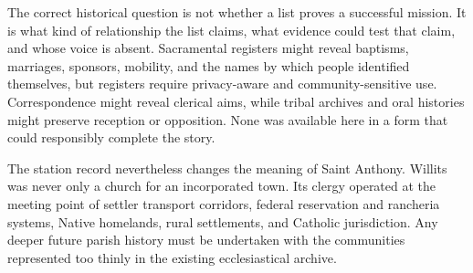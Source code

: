 The correct historical question is not whether a list proves a successful mission. It is what kind of relationship the list claims, what evidence could test that claim, and whose voice is absent. Sacramental registers might reveal baptisms, marriages, sponsors, mobility, and the names by which people identified themselves, but registers require privacy-aware and community-sensitive use. Correspondence might reveal clerical aims, while tribal archives and oral histories might preserve reception or opposition. None was available here in a form that could responsibly complete the story.


The station record nevertheless changes the meaning of Saint Anthony. Willits was never only a church for an incorporated town. Its clergy operated at the meeting point of settler transport corridors, federal reservation and rancheria systems, Native homelands, rural settlements, and Catholic jurisdiction. Any deeper future parish history must be undertaken with the communities represented too thinly in the existing ecclesiastical archive.
